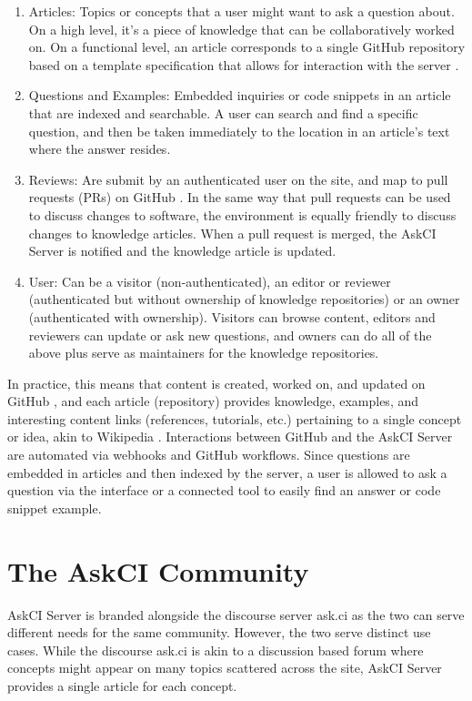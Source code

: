 \documentclass{jors}
\begin{document}
\begin{enumerate}
 \item Articles: Topics or concepts that a user might want to ask a question about. On a high level, it's a piece of knowledge that can be collaboratively worked on. On a functional level, an article corresponds to a single GitHub repository based on a template specification that allows for interaction with the server \cite{tech-spec}.
\item Questions and Examples: Embedded inquiries or code snippets in an article that are indexed and searchable. A user can search and find a specific question, and then be taken immediately to the location in an article's text where the answer resides.
 \item Reviews: Are submit by an authenticated user on the site, and map to pull requests (PRs) on GitHub \cite{github-pr}. In the same way that pull requests can be used to discuss changes to software, the environment is equally friendly to discuss changes to knowledge articles. When a pull request is merged, the AskCI Server is notified and the knowledge article is updated.
 \item User: Can be a visitor (non-authenticated), an editor or reviewer (authenticated but without ownership of knowledge repositories) or an owner (authenticated with ownership). Visitors can browse content, editors and reviewers can update or ask new questions, and owners can do all of the above plus serve as maintainers for the knowledge repositories.
\end{enumerate}

In practice, this means that content is created, worked on, and updated on GitHub \cite{github}, and each article (repository) provides knowledge, examples, and interesting content links (references, tutorials, etc.) pertaining to a single concept or idea, akin to Wikipedia \cite{wikipedia}. Interactions between GitHub and the AskCI Server are automated via webhooks and GitHub workflows. Since questions are embedded in articles and then indexed by the server, a user is allowed to ask a question via the interface or a connected tool to easily find an answer or code snippet example.

\section*{The AskCI Community}

AskCI Server is branded alongside the discourse server ask.ci \cite{askci} as the two can serve different needs for the same community. However, the two serve distinct use cases. While the discourse ask.ci \cite{askci} is akin to a discussion based forum where concepts might appear on many topics scattered across the site, AskCI Server \cite{askci-server} provides a single article for each concept. \newline
\end{document}
